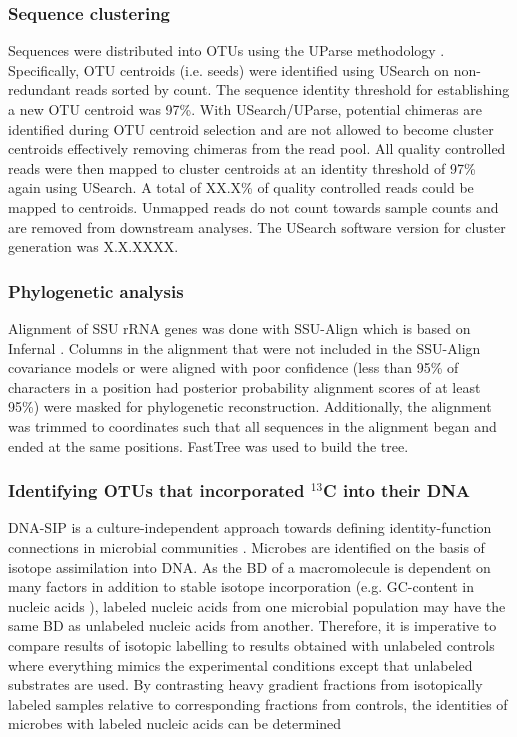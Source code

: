 \subsubsection{Sequence clustering}
Sequences were distributed into OTUs using the UParse methodology
\citep{23955772}. Specifically, OTU centroids (i.e. seeds) were identified
using USearch on non-redundant reads sorted by count. The sequence
identity threshold for establishing a new OTU centroid was 97\%. 
With USearch/UParse,
potential chimeras are identified during OTU centroid selection and are not
allowed to become cluster centroids effectively removing chimeras from the read
pool. All quality controlled reads were then mapped to cluster centroids at an
identity threshold of 97\% again using USearch. A total of XX.X\% of quality
controlled reads could be mapped to centroids. Unmapped reads do not count
towards sample counts and are removed from downstream analyses. The
USearch software version for cluster generation was X.X.XXXX.

\subsubsection{Phylogenetic analysis}
Alignment of SSU rRNA genes was done with SSU-Align which is based on Infernal
\citep{24008419,19307242}. Columns in the alignment that were not included in
the SSU-Align covariance models or were aligned with poor confidence (less than
95\% of characters in a position had posterior probability alignment scores of
at least 95\%) were masked for phylogenetic reconstruction. Additionally, the
alignment was trimmed to coordinates such that all sequences in the alignment
began and ended at the same positions. FastTree \citep{20224823} was used to
build the tree.

\subsubsection{Identifying OTUs that incorporated $^{13}$C into their DNA}
DNA-SIP is a culture-independent approach towards defining identity-function
connections in microbial communities \citep{Buckley_2011, 17446886,
Radajewski_2001}. Microbes are identified on the basis of
isotope assimilation into DNA. As the BD of a macromolecule is dependent on many factors in addition to stable isotope incorporation (e.g. GC-content in nucleic acids \citep{25139123}),
labeled nucleic acids from one microbial population may have the same BD as unlabeled nucleic acids from another. Therefore, it is imperative to compare results of isotopic labelling to results obtained with unlabeled controls where everything mimics the experimental conditions except that unlabeled substrates are used. By contrasting heavy gradient fractions from isotopically labeled samples relative to corresponding fractions from controls, the identities of microbes with labeled nucleic acids can be
determined 

